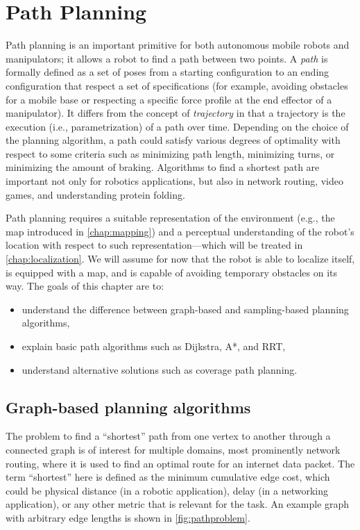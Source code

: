 \chapter{Path Planning}\label{chap:pathplanning}

Path planning is an important primitive for both autonomous mobile robots and manipulators; it allows a robot to find a path between two points.
A \textsl{path} is formally defined as a set of poses from a starting configuration to an ending configuration that respect a set of specifications (for example, avoiding obstacles for a mobile base or respecting a specific force profile at the end effector of a manipulator). It differs from the concept of \textsl{trajectory} in that a trajectory is the execution (i.e., parametrization) of a path over time.
Depending on the choice of the planning algorithm, a path could satisfy various degrees of optimality with respect to some criteria such as minimizing path length, minimizing turns, or minimizing the amount of braking.
Algorithms to find a shortest path are important not only for robotics applications, but also in network routing, video games, and understanding protein folding.

Path planning requires a suitable representation of the environment (e.g., the map introduced in \cref{chap:mapping}) and a perceptual understanding of the robot's location with respect to such representation---which will be treated in \cref{chap:localization}. We will assume for now that the robot is able to localize itself, is equipped with a map, and is capable of avoiding temporary obstacles on its way. The goals of this chapter are to:

\begin{itemize}
\item understand the difference between graph-based and sampling-based planning algorithms,
\item explain basic path algorithms such as Dijkstra, A*, and RRT,
\item understand alternative solutions such as coverage path planning.
\end{itemize}

\section{Graph-based planning algorithms}\label{chap:pathplanning:graph-based}

The problem to find a ``shortest'' path from one vertex to another through a connected graph is of interest for multiple domains, most prominently network routing, where it is used to find an optimal route for an internet data packet.
The term ``shortest'' here is defined as the minimum cumulative edge cost, which could be physical distance (in a robotic application), delay (in a networking application), or any other metric that is relevant for the task. An example graph with arbitrary edge lengths is shown in \cref{fig:pathproblem}.

